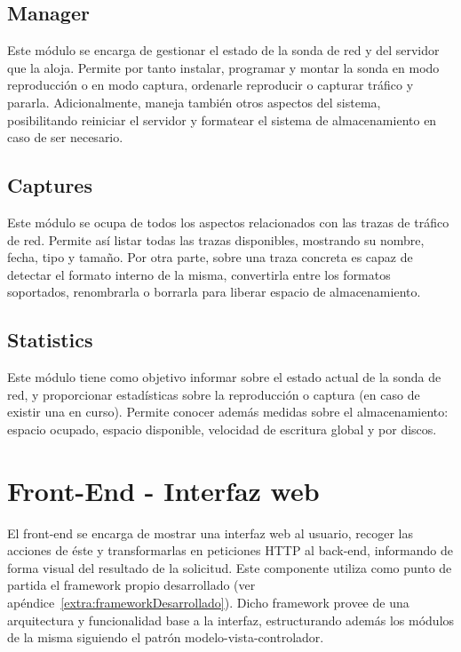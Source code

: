 \subsection{Manager\label{ssec:dis:manager}}

Este módulo se encarga de gestionar el estado de la sonda de red y del servidor que la aloja.
Permite por tanto instalar, programar y montar la sonda en modo reproducción o en modo captura, ordenarle reproducir o capturar tráfico y pararla.
Adicionalmente, maneja también otros aspectos del sistema, posibilitando reiniciar el servidor y formatear el sistema de almacenamiento en caso de ser necesario.


\subsection{Captures\label{ssec:dis:captures}}

Este módulo se ocupa de todos los aspectos relacionados con las \glspl{traza} de tráfico de red.
Permite así listar todas las \glspl{traza} disponibles, mostrando su nombre, fecha, tipo y tamaño.
Por otra parte, sobre una \gls{traza} concreta es capaz de detectar el formato interno de la misma, convertirla entre los formatos soportados, renombrarla o borrarla para liberar espacio de almacenamiento.


\subsection{Statistics\label{ssec:dis:statistics}}

Este módulo tiene como objetivo informar sobre el estado actual de la sonda de red, y proporcionar estadísticas sobre la reproducción o captura (en caso de existir una en curso).
Permite conocer además medidas sobre el almacenamiento: espacio ocupado, espacio disponible, velocidad de escritura global y por discos.


\section{Front-End - Interfaz web\label{sec:dis:interfaz_web}}

El \gls{front-end} se encarga de mostrar una interfaz web al usuario, recoger las acciones de éste y transformarlas en peticiones \gls{HTTP} al \gls{back-end}, informando de forma visual del resultado de la solicitud.
Este componente utiliza como punto de partida el \gls{framework} propio desarrollado (ver apéndice~\ref{extra:frameworkDesarrollado}).
Dicho \gls{framework} provee de una arquitectura y funcionalidad base a la interfaz, estructurando además los módulos de la misma siguiendo el patrón modelo-vista-controlador.

